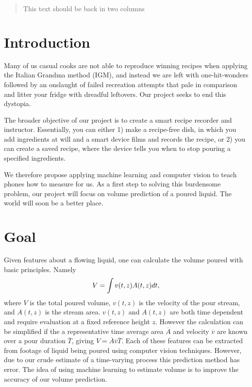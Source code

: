 \documentclass[twocolumn]{article}
\begin{document}

\begin{abstract}
This text should be back in two columns
\end{abstract}

\section{Introduction}
Many of us casual cooks are not able to reproduce winning recipes when applying the Italian Grandma method (IGM), and instead we are left with one-hit-wonders followed by an onslaught of failed recreation attempts that pale in comparison and litter your fridge with dreadful leftovers. Our project seeks to end this dystopia. 

The broader objective of our project is to create a smart recipe recorder and instructor. Essentially, you can either 1) make a recipe-free dish, in which you add ingredients at will and a smart device films and records the recipe, or 2) you can create a saved recipe, where the device tells you when to stop pouring a specified ingredients. 
 	
We therefore propose applying machine learning and computer vision to teach phones how to measure for us. As a first step to solving this burdensome problem, our project will focus on volume prediction of a poured liquid. The world will soon be a better place.

\section{Goal}     
Given features about a flowing liquid, one can calculate the volume poured with basic principles. Namely 
\begin{equation} \label{eq:1}
V = \int v(t,z) A(t,z) dt \\,
\end{equation}
where $V$ is the total poured volume, $v(t,z)$ is the velocity of the pour stream, and $A(t,z)$ is the stream area. $v(t,z)$ and $A(t,z)$ are both time dependent and require evaluation at a fixed reference height $z$. However the calculation can be simplified if the a representative time average area $\overline{A}$ and velocity $\overline{v}$ are known over a pour duration $\overline{T}$, giving $V = \overline{A} \overline{v} \overline{T}$. Each of these features can be extracted from footage of liquid being poured using computer vision techniques. However, due to our crude estimate of a time-varying process this prediction method has error. The idea of using machine learning to estimate volume is to improve the accuracy of our volume prediction. 
\end{document}
